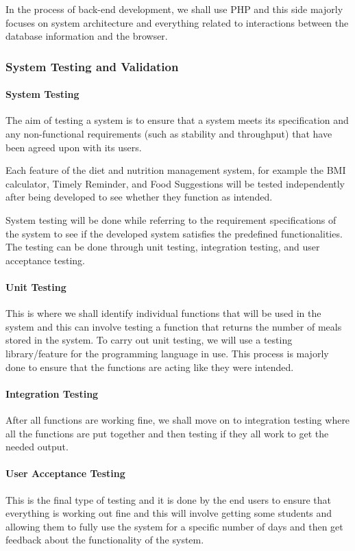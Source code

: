 \documentclass{article}
\begin{document}
In the process of back-end development, we shall use PHP and this side majorly focuses on system architecture and everything related to interactions between the database information and the browser. 

\subsubsection{System Testing and Validation}
\paragraph{System Testing \\}
The aim of testing a system is to ensure that a system meets its specification and any non-functional requirements (such as stability and throughput) that have been agreed upon with its users.

Each feature of the diet and nutrition management system, for example the BMI calculator, Timely Reminder, and Food Suggestions will be tested independently after being developed to see whether they function as intended.

System testing will be done while referring to the requirement specifications of the system to see if the developed system satisfies the predefined functionalities. The testing can be done through unit testing, integration testing, and user acceptance testing. 

\paragraph{Unit Testing \\}
This is where we shall identify individual functions that will be used in the system and this can involve testing a function that returns the number of meals stored in the system. To carry out unit testing, we will use a testing library/feature for the programming language in use. This process is majorly done to ensure that the functions are acting like they were intended. 

\paragraph{Integration Testing \\}
After all functions are working fine, we shall move on to integration testing where all the functions are put together and then testing if they all work to get the needed output.

\paragraph{User Acceptance Testing \\}
This is the final type of testing and it is done by the end users to ensure that everything is working out fine and this will involve getting some students and allowing them to fully use the system for a specific number of days and then get feedback about the functionality of the system. 
\end{document}
